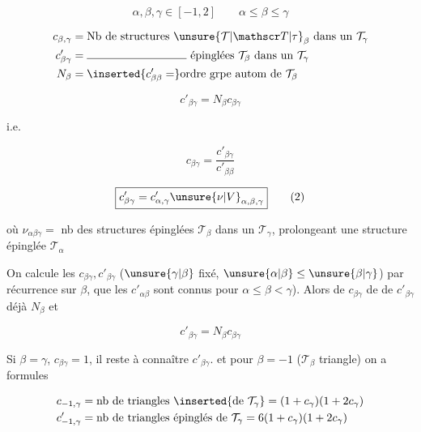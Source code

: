 \[ \alpha,\beta,\gamma\in[-1,2]\qquad\alpha\leq\beta\leq\gamma \]

\[
\begin{aligned}
c_{\beta,\gamma}&=\text{Nb de structures }\unsure{\mathcal T|\mathscr T|\tau}_\beta\ \text{dans un }\mathcal T_\gamma\\
c'_{\beta\gamma}&=\rule{3.1cm}{.4pt}\ \text{épinglées }\mathcal T_\beta\ \text{dans un }\mathcal T_\gamma\\
N_\beta&=\inserted{c'_{\beta\beta}=}\text{ordre grpe autom de }\mathcal T_\beta
\end{aligned}
\]

\[ \boxed{c'_{\beta\gamma}=N_\beta c_{\beta\gamma}}\tag*{(1)} \]

 i.e.

\[ \boxed{c_{\beta\gamma}=\frac{c'_{\beta\gamma}}{c'_{\beta\beta}}} \]

\[ \boxed{c'_{\beta\gamma}=c'_{\alpha,\gamma}\unsure{\nu|V}_{\alpha,\beta,\gamma}}\tag*{(2)} \]

où $\nu_{\alpha\beta\gamma}={}$ nb des structures épinglées $\mathcal T_\beta$ dans un $\mathcal T_\gamma$, prolongeant une structure épinglée $\mathcal T_\alpha$

On calcule les  $c_{\beta\gamma},c'_{\beta\gamma}$ ($\unsure{\gamma|\beta}$ fixé,  $\unsure{\alpha|\beta}\leq\unsure{\beta|\gamma}$) par récurrence sur $\beta$,     que les $c'_{\alpha\beta}$ sont connus pour $\alpha\leq\beta<\gamma$). Alors  de $c_{\beta\gamma}$     de  de $c'_{\beta\gamma}$   déjà $N_\beta$ et

\[ c'_{\beta\gamma}=N_\beta c_{\beta\gamma} \]

Si $\beta=\gamma$, $c_{\beta\gamma}=1$,  il reste à connaître $c'_{\beta\gamma}$.  et pour $\beta=-1$ ($\mathcal T_\beta$ triangle) on a formules

\[
\begin{aligned}
c_{-1,\gamma}&=\text{nb de triangles }\inserted{\text{de }\mathcal T_\gamma}=(1+c_\gamma)(1+2c_\gamma)\\
c'_{-1,\gamma}&=\text{nb de triangles épinglés de }\mathcal T_\gamma=6(1+c_\gamma)(1+2c_\gamma)
\end{aligned}
\]

